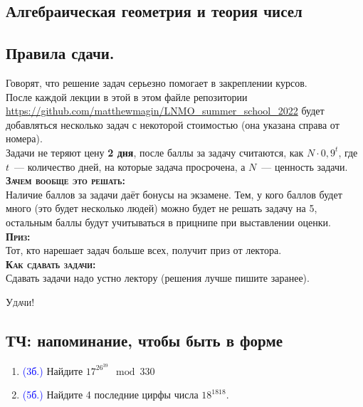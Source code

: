 \documentclass[11pt]{article}
\begin{document}
\begin{center}
        \section*{Алгебраическая геометрия и теория чисел}
    \end{center}
    \tableofcontents
    \newpage
    \subsection*{Правила сдачи.}

    Говорят, что решение задач серьезно помогает в закреплении курсов. \\

    После каждой лекции в этой в этом файле  репозитории \url{https://github.com/matthewmagin/LNMO_summer_school_2022}
    будет добавляться несколько задач с некоторой стоимостью (она указана справа от номера).\\

    Задачи не теряют цену \textbf{2 дня}, после баллы за задачу считаются, как $N \cdot 0,9^{t}$, где
    $t$~--- количество дней, на которые задача просрочена, а $N$~--- ценность задачи. \\

    \textbf{\textsc{Зачем вообще это решать:}}\\
    Наличие баллов за задачи даёт бонусы на экзамене. Тем, у кого баллов будет много
    (это будет несколько людей) можно будет не решать задачу на 5, остальным баллы будут учитываться в прицнипе при выставлении оценки.\\

    \textbf{\textsc{Приз:}}\\
    Тот, кто нарешает задач больше всех, получит приз от лектора.\\

    \textbf{\textsc{Как сдавать задачи:}}\\
    Сдавать задачи надо устно лектору (решения лучше пишите заранее).

    \begin{center}
        \textsc{Удачи!}
    \end{center}
    \newpage

    \subsection{ТЧ: напоминание, чтобы быть в форме}
    \begin{enumerate}[start=1,label={\bfseries \arabic*.}]
        \item \textcolor{blue}{(3б.)} Найдите $17^{26^{39}} \mod{330}$

        \item \textcolor{blue}{(5б.)} Найдите 4 последние цирфы числа $18^{1818}$.

    \end{enumerate}
\end{document}
